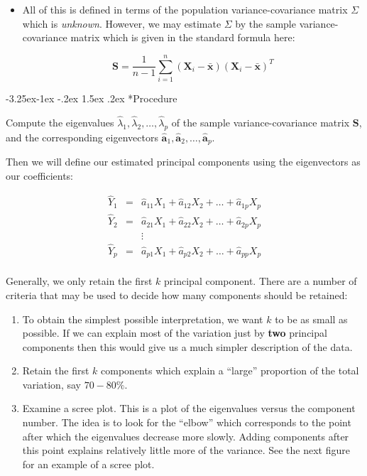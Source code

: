 \documentclass[]{book}
\makeatletter
\newenvironment{rmdblock}[1]
  {\begin{shaded*}
  \begin{itemize}
  \renewcommand{\labelitemi}{
    \raisebox{-.7\height}[0pt][0pt]{
      {\setkeys{Gin}{width=2em,keepaspectratio}\texttt{[image: img/icons/\#1]}}
    }
  }
  \item
  }
  {
  \end{itemize}
  \end{shaded*}
  }
\newenvironment{rmdcaution}
  {\begin{rmdblock}{caution}}
  {\end{rmdblock}}
\renewcommand\subsection{\@startsection{subsection}{2}{\z@}%
                                     {-3.25ex\@plus -1ex \@minus -.2ex}%
                                     {1.5ex \@plus .2ex}%
                                     {\normalfont\large\bfseries\color{Violet}}}
\theoremstyle{definition}
\theoremstyle{definition}
\theoremstyle{definition}
\theoremstyle{remark}
\makeatother
\begin{document}
\begin{rmdcaution}
All of this is defined in terms of the population variance-covariance
matrix \(\Sigma\) which is \emph{unknown}. However, we may estimate
\(\Sigma\) by the sample variance-covariance matrix which is given in
the standard formula here:

\[ \textbf{S} = \frac{1}{n-1} \sum_{i=1}^{n}(\mathbf{X}_i-\bar{\textbf{x}})(\mathbf{X}_i-\bar{\textbf{x}})^T \]
\end{rmdcaution}

\subsection*{Procedure}\label{procedure}

Compute the eigenvalues
\(\hat{\lambda}_1, \hat{\lambda}_2, \dots, \hat{\lambda}_p\) of the
sample variance-covariance matrix \(\textbf{S}\), and the corresponding
eigenvectors
\(\hat{\mathbf{a}}_1, \hat{\mathbf{a}}_2, \dots, \hat{\mathbf{a}}_p\).

Then we will define our estimated principal components using the
eigenvectors as our coefficients:

\[ \begin{array}{lll} \hat{Y}_1 & = & \hat{a}_{11}X_1 + \hat{a}_{12}X_2 + \dots + \hat{a}_{1p}X_p \\ \hat{Y}_2 & = & \hat{a}_{21}X_1 + \hat{a}_{22}X_2 + \dots + \hat{a}_{2p}X_p \\&&\vdots\\ \hat{Y}_p & = & \hat{a}_{p1}X_1 + \hat{a}_{p2}X_2 + \dots + \hat{a}_{pp}X_p \\ \end{array} \]

Generally, we only retain the first \(k\) principal component. There are
a number of criteria that may be used to decide how many components
should be retained:

\begin{enumerate}
\def\labelenumi{\arabic{enumi}.}
\item
  To obtain the simplest possible interpretation, we want \(k\) to be as
  small as possible. If we can explain most of the variation just by
  \textbf{two} principal components then this would give us a much
  simpler description of the data.
\item
  Retain the first \(k\) components which explain a ``large'' proportion
  of the total variation, say \(70-80\%\).
\item
  Examine a scree plot. This is a plot of the eigenvalues versus the
  component number. The idea is to look for the ``elbow'' which
  corresponds to the point after which the eigenvalues decrease more
  slowly. Adding components after this point explains relatively little
  more of the variance. See the next figure for an example of a scree
  plot.
\end{enumerate}
\end{document}

